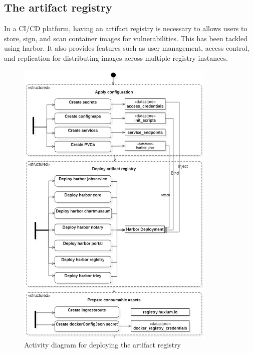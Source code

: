\subsection{The artifact registry }

\hspace{7mm}In a CI/CD platform, having an artifact registry is necessary to allows users to store, sign, and scan container images for vulnerabilities. This has been tackled using harbor. It also provides features such as user management, access control, and replication for distributing images across multiple registry instances. 

\begin{figure}[H]\centering
\includegraphics[width=0.85\textwidth,angle=00]{assets/f39.png}
\caption{Activity diagram for deploying the artifact registry }
\label{fig:diagram for deploying the artifact registry}
\end{figure}

